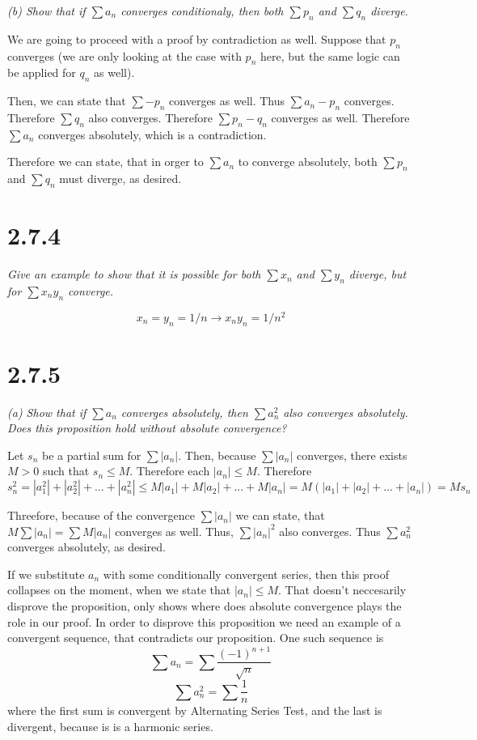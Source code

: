 \documentclass[11pt,oneside,titlepage]{article}
\begin{document}
\textit{(b) Show that if $\sum a_n$ converges conditionaly, then both
  $\sum p_n$ and $\sum q_n$ diverge.}

We are going to proceed with a proof by contradiction as well. Suppose that
$p_n$ converges (we are only looking at the case with $p_n$ here, but the
same logic can be applied for $q_n$ as well).

Then, we can state that $\sum -p_n$ converges as well. Thus $\sum a_n - p_n$
converges. Therefore $\sum q_n$ also converges. Therefore $\sum p_n - q_n$
converges as well. Therefore $\sum a_n$ converges absolutely, which is a
contradiction.

Therefore we can state, that in orger to $\sum a_n$ to converge absolutely,
both $\sum p_n$ and $\sum q_n$ must diverge, as desired.

\section*{2.7.4}
\textit{Give an example to show that it is possible for both $\sum x_n$ and
  $\sum y_n$ diverge, but for $\sum x_n y_n$ converge.}

$$x_n = y_n = 1/n \to x_n y_n = 1/n^2$$

\section*{2.7.5}
\textit{(a) Show that if $\sum a_n$ converges absolutely, then $\sum a_n^2$
  also converges absolutely. Does this proposition hold without absolute
  convergence?}

Let $s_n$ be a partial sum for $\sum |a_n|$. Then, because $\sum |a_n|$
converges, there exists $M > 0$ such that $s_n \leq M$. Therefore
each $|a_n| \leq M$. Therefore
$$s_n^2 = |a_1^2| + |a_2^2| + ... + |a_n^2| \leq M|a_1| + M|a_2| + ... +
M|a_n| = M(|a_1| + |a_2| + ... + |a_n|) = Ms_n$$

Threefore, because of the convergence $\sum |a_n|$ we can state, that
$M\sum |a_n| = \sum M |a_n|$ converges as well. Thus, $\sum |a_n|^2$ also
converges. Thus $\sum a_n^2$ converges absolutely, as desired.

If we substitute $a_n$ with some conditionally convergent series, then
this proof collapses on the moment, when we state that $|a_n| \leq M$. That
doesn't neccesarily disprove the proposition, only shows where does
absolute convergence plays the role  in our proof. In order to disprove
this proposition we need an example of a convergent sequence, that contradicts
our proposition. One such sequence is
$$\sum a_n = \sum \frac{(-1)^{n + 1}}{\sqrt{n}}$$
$$\sum a_n^2 = \sum \frac{1}{n}$$
where the first sum is convergent by Alternating Series Test, and the last
is divergent, because is is a harmonic series.
\end{document}
